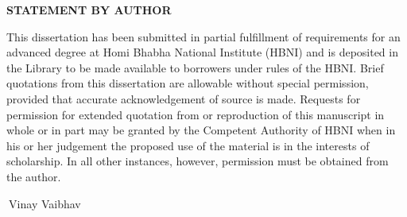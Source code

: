 \thispagestyle{plain}
\doublespacing
\centerline{{\bf {\large STATEMENT BY AUTHOR}}}
%
\vskip 1.00cm

%
This dissertation has been submitted in partial fulfillment of
requirements for an advanced degree at Homi Bhabha National Institute
(HBNI) and is deposited in the Library to be made available to borrowers
under rules of the HBNI.
%
\vskip 0.6cm
%
Brief quotations from this dissertation are allowable without special
permission, provided that accurate acknowledgement of source is made.
Requests for permission for extended quotation from or reproduction of
this manuscript in whole or in part may be granted by the Competent
Authority of HBNI when in his or her judgement the proposed use of the
material is in the interests of scholarship. In all other instances,
however, permission must be obtained from the author.

\vskip 4.0cm


$~$\hspace{10.2cm}Vinay Vaibhav
%
